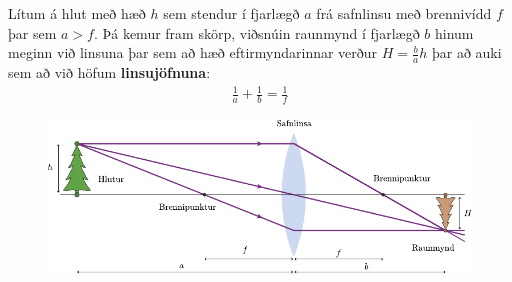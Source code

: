 \ifdefined \wholebook \else\documentclass[oneside]{book}\usepackage{EdlBook}\graphicspath{{figures/}}
\begin{document}
\begin{tcolorbox}
\begin{theorem}
Lítum á hlut með hæð $h$ sem stendur í fjarlægð $a$ frá safnlinsu með brennivídd $f$ þar sem $a>f$. Þá kemur fram skörp, viðsnúin raunmynd í fjarlægð $b$ hinum meginn við linsuna þar sem að hæð eftirmyndarinnar verður $H = \frac{b}{a}h$ þar að auki sem að við höfum \textbf{linsujöfnuna}:
\begin{align*}
    \frac{1}{a} + \frac{1}{b} = \frac{1}{f}
\end{align*}
\begin{figure}[H]
    \centering
    \includegraphics{figures/safnlinsa-raunmynd.pdf}
\end{figure}
\end{theorem}
\end{tcolorbox}
\end{document}
